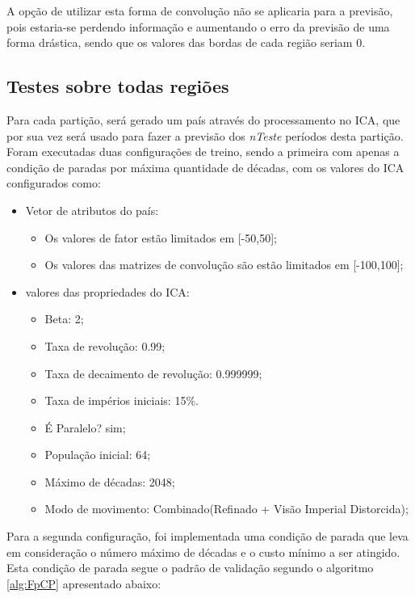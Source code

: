 A opção de utilizar esta forma de convolução não se aplicaria para a previsão, pois estaria-se perdendo informação e aumentando o erro da previsão de uma forma drástica, sendo que os valores das bordas de cada região seriam 0.


\subsection{Testes sobre todas regiões}
\label{Exp:Testes sobre todas regiões}


Para cada partição, será gerado um país através do processamento no ICA, que por sua vez será usado para fazer a previsão dos \emph{nTeste} períodos desta partição. Foram  executadas duas configurações de treino, sendo a primeira com apenas a condição de paradas por máxima quantidade de décadas, com os valores do ICA configurados como:

\begin{itemize}
\item Vetor de atributos do país:

  \begin{itemize}
  \item Os valores de fator estão limitados em [-50,50];
  \item Os valores das matrizes de convolução são estão limitados em [-100,100];
  \end{itemize}

\item valores das propriedades do ICA:

  \begin{itemize}
  \item Beta: 2;
  \item Taxa de revolução: 0.99;
  \item Taxa de decaimento de revolução: 0.999999;
  \item Taxa de impérios iniciais: 15\%.
  \item É Paralelo? sim;
  \item População inicial: 64;
  \item Máximo de décadas: 2048;
  \item Modo de movimento: Combinado(Refinado + Visão Imperial Distorcida);
  \end{itemize}

\end{itemize}

Para a segunda configuração, foi implementada uma condição de parada que leva em consideração o número máximo de décadas e o custo mínimo a ser atingido. Esta condição de parada segue o padrão de validação segundo o algoritmo \ref{alg:FpCP} apresentado abaixo:
	
